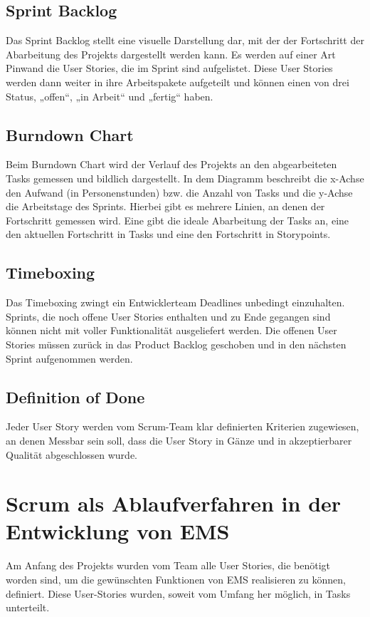 		\subsection{Sprint Backlog}
		Das Sprint Backlog stellt eine visuelle Darstellung dar, mit der der Fortschritt der Abarbeitung des Projekts dargestellt werden kann. Es werden auf einer Art Pinwand die User Stories, die im Sprint sind aufgelistet. Diese User Stories werden dann weiter in ihre Arbeitspakete aufgeteilt und können einen von drei Status, „offen“, „in Arbeit“ und „fertig“ haben.
		\subsection{Burndown Chart}
		Beim Burndown Chart wird der Verlauf des Projekts an den abgearbeiteten Tasks gemessen und bildlich dargestellt. In dem Diagramm beschreibt die x-Achse den Aufwand (in Personenstunden) bzw. die Anzahl von Tasks und die y-Achse die Arbeitstage des Sprints. 
Hierbei gibt es mehrere Linien, an denen der Fortschritt gemessen wird. Eine gibt die ideale Abarbeitung der Tasks an, eine den aktuellen Fortschritt in Tasks und eine den Fortschritt in Storypoints.

		\subsection{Timeboxing}
		Das Timeboxing zwingt ein Entwicklerteam Deadlines unbedingt einzuhalten. Sprints, die noch offene User Stories enthalten und zu Ende gegangen sind können nicht mit voller Funktionalität ausgeliefert werden. Die offenen User Stories müssen zurück in das Product Backlog geschoben und in den nächsten Sprint aufgenommen werden.
		\subsection{Definition of Done}
  Jeder User Story werden vom Scrum-Team klar definierten Kriterien zugewiesen, an denen Messbar sein soll, dass die User Story in Gänze und in akzeptierbarer Qualität abgeschlossen wurde.
	\section{Scrum als Ablaufverfahren in der Entwicklung von EMS}
	
		Am Anfang des Projekts wurden vom Team alle User Stories, die benötigt worden sind, um die gewünschten Funktionen von EMS realisieren zu können, definiert. Diese User-Stories wurden, soweit vom Umfang her möglich, in Tasks unterteilt. 
		
